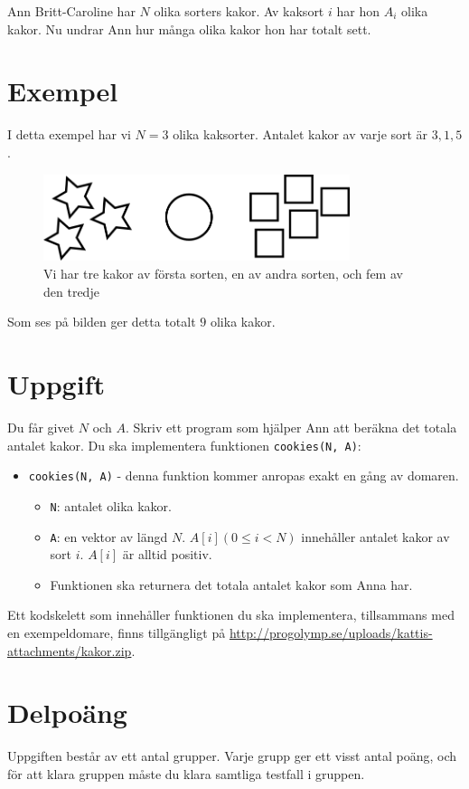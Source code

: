 \newcommand\version{v1}
Ann Britt-Caroline har $N$ olika sorters kakor. Av kaksort $i$ har hon $A_i$ olika kakor. Nu undrar Ann hur många olika kakor hon har totalt sett.

\section*{Exempel}
I detta exempel har vi $N = 3$ olika kaksorter. Antalet kakor av varje sort är $3, 1, 5$.

\begin{figure}[h!]
  \centering
  \includegraphics[width=0.8\textwidth]{sample.png}
  \caption{Vi har tre kakor av första sorten, en av andra sorten, och fem av den tredje}
\end{figure}

Som ses på bilden ger detta totalt $9$ olika kakor.

\section*{Uppgift}
Du får givet $N$ och $A$. Skriv ett program som hjälper Ann att beräkna det totala antalet kakor. Du ska implementera funktionen \texttt{cookies(N, A)}:
\begin{itemize}
  \item \texttt{cookies(N, A)} - denna funktion kommer anropas exakt en gång av domaren.
  \begin{itemize}
    \item \texttt{N}: antalet olika kakor.
    \item \texttt{A}: en vektor av längd $N$. $A[i] (0 \le i < N) $ innehåller antalet kakor av sort $i$. $A[i]$ är alltid positiv.
    \item Funktionen ska returnera det totala antalet kakor som Anna har.
  \end{itemize}
\end{itemize}

Ett kodskelett som innehåller funktionen du ska implementera, tillsammans med en exempeldomare, finns tillgängligt på
\url{http://progolymp.se/uploads/kattis-attachments/kakor.zip}.

\section*{Delpoäng}
Uppgiften består av ett antal grupper. Varje grupp ger ett visst antal poäng, och för att klara
gruppen måste du klara samtliga testfall i gruppen.

